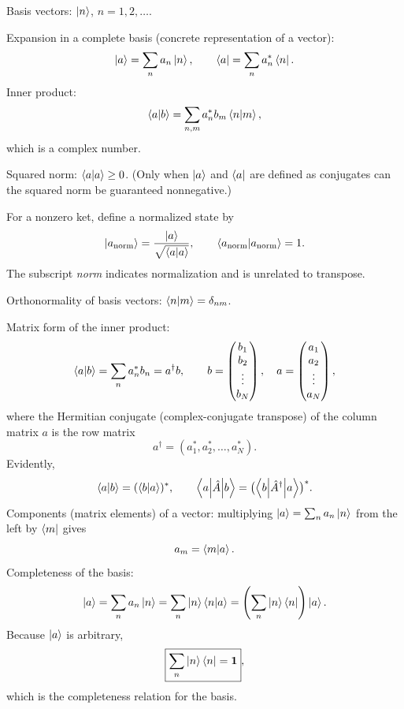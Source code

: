 Basis vectors: $\left|n\right\rangle$, $n=1,2,\ldots$.

Expansion in a complete basis (concrete representation of a vector):
\begin{equation}
\left|a\right\rangle=\sum_n a_n\left|n\right\rangle,\qquad \left\langle a\right|=\sum_n a_n^*\left\langle n\right|.
\end{equation}
Inner product:
\begin{equation}
\left\langle a\middle|b\right\rangle=\sum_{n,m}a_n^*b_m\left\langle n\middle|m\right\rangle,
\end{equation}
which is a complex number.

Squared norm: $\left\langle a\middle|a\right\rangle\geq0$. (Only when $\left|a\right\rangle$ and $\left\langle a\right|$ are defined as conjugates can the squared norm be guaranteed nonnegative.)

For a nonzero ket, define a normalized state by
\begin{equation}
\left|a_{\mathrm{norm}}\right\rangle=\frac{\left|a\right\rangle}{\sqrt{\left\langle a\middle|a\right\rangle}},\qquad
\left\langle a_{\mathrm{norm}}\middle|a_{\mathrm{norm}}\right\rangle=1.
\end{equation}
The subscript \emph{norm} indicates normalization and is unrelated to transpose.

Orthonormality of basis vectors: $\left\langle n\middle|m\right\rangle=\delta_{nm}$.

Matrix form of the inner product:
\begin{equation}
\left\langle a\middle|b\right\rangle=\sum_n a_n^*b_n=a^\dagger b,
\qquad b=\begin{pmatrix}b_1\\b_2\\\vdots\\b_N\end{pmatrix},\quad
 a=\begin{pmatrix}a_1\\a_2\\\vdots\\a_N\end{pmatrix},
\end{equation}
where the Hermitian conjugate (complex-conjugate transpose) of the column matrix $a$ is the row matrix
\begin{equation}
a^\dagger=(a_1^*,a_2^*,\ldots,a_N^*).
\end{equation}
Evidently,
\begin{equation}
\left\langle a\middle|b\right\rangle=(\left\langle b\middle|a\right\rangle)^*,\qquad
\left\langle a\middle|\hat{A}\middle|b\right\rangle=\bigl(\left\langle b\middle|\hat{A}^\dagger\middle|a\right\rangle\bigr)^*.
\end{equation}
Components (matrix elements) of a vector: multiplying $\left|a\right\rangle=\sum_n a_n\left|n\right\rangle$ from the left by $\left\langle m\right|$ gives
\begin{equation}
a_m=\left\langle m\middle|a\right\rangle.
\end{equation}
Completeness of the basis:
\begin{equation}
\left|a\right\rangle=\sum_n a_n\left|n\right\rangle=\sum_n\left|n\right\rangle\left\langle n\middle|a\right\rangle
=\left(\sum_n\left|n\right\rangle\left\langle n\right|\right)\left|a\right\rangle.
\end{equation}
Because $\left|a\right\rangle$ is arbitrary,
\begin{equation}
\boxed{\sum_n\left|n\right\rangle\left\langle n\right|=\mathbf1},
\end{equation}
which is the completeness relation for the basis.


